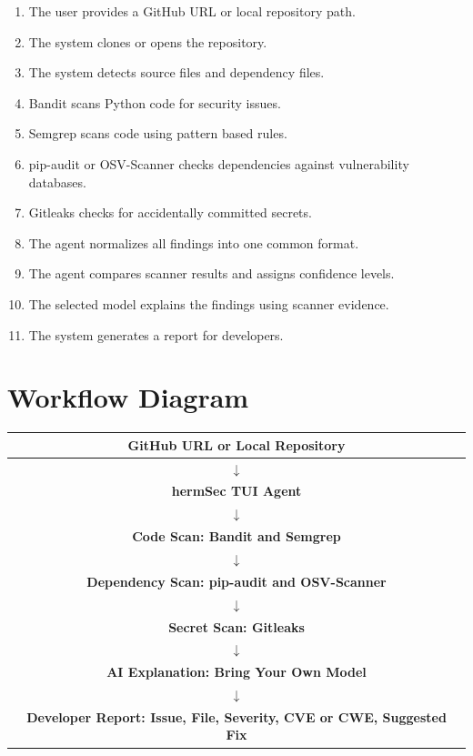 \documentclass[
    numbers=noenddot,
    parskip=half-,
    fontsize=11pt,
    paper=a4,
    oneside,
    titlepage,
    bibliography=totoc,
    chapterprefix=false
]{scrbook}
\begin{document}
\begin{enumerate}
    \item The user provides a GitHub URL or local repository path.
    \item The system clones or opens the repository.
    \item The system detects source files and dependency files.
    \item Bandit scans Python code for security issues.
    \item Semgrep scans code using pattern based rules.
    \item pip-audit or OSV-Scanner checks dependencies against vulnerability databases.
    \item Gitleaks checks for accidentally committed secrets.
    \item The agent normalizes all findings into one common format.
    \item The agent compares scanner results and assigns confidence levels.
    \item The selected model explains the findings using scanner evidence.
    \item The system generates a report for developers.
\end{enumerate}

\section{Workflow Diagram}

\begin{center}
\begin{tabular}{c}
\toprule
\textbf{GitHub URL or Local Repository} \\
\midrule
$\downarrow$ \\
\textbf{hermSec TUI Agent} \\
$\downarrow$ \\
\textbf{Code Scan: Bandit and Semgrep} \\
$\downarrow$ \\
\textbf{Dependency Scan: pip-audit and OSV-Scanner} \\
$\downarrow$ \\
\textbf{Secret Scan: Gitleaks} \\
$\downarrow$ \\
\textbf{AI Explanation: Bring Your Own Model} \\
$\downarrow$ \\
\textbf{Developer Report: Issue, File, Severity, CVE or CWE, Suggested Fix} \\
\bottomrule
\end{tabular}
\end{center}
\end{document}
